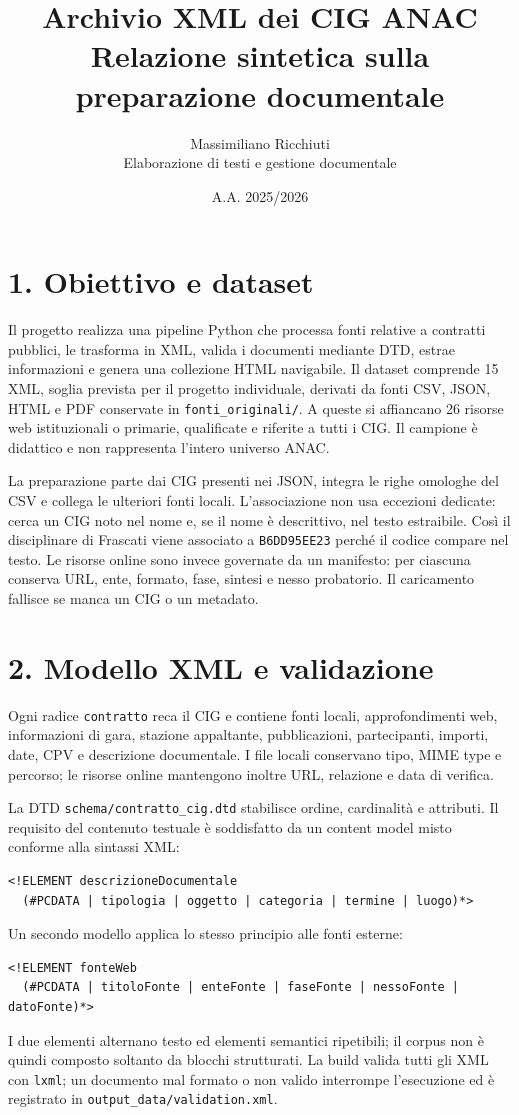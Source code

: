 \documentclass[10pt,a4paper]{article}
\title{\vspace{-1.2cm}\textbf{Archivio XML dei CIG ANAC}\\[2pt]\large Relazione sintetica sulla preparazione documentale}
\author{Massimiliano Ricchiuti\\Elaborazione di testi e gestione documentale}
\date{A.A. 2025/2026}
\newcommand{\code}[1]{\texttt{#1}}
\begin{document}
\maketitle
\vspace{-1.1cm}

\section*{1. Obiettivo e dataset}
Il progetto realizza una pipeline Python che processa fonti relative a contratti pubblici, le trasforma in XML, valida i documenti mediante DTD, estrae informazioni e genera una collezione HTML navigabile. Il dataset comprende 15 XML, soglia prevista per il progetto individuale, derivati da fonti CSV, JSON, HTML e PDF conservate in \code{fonti\_originali/}. A queste si affiancano 26 risorse web istituzionali o primarie, qualificate e riferite a tutti i CIG. Il campione è didattico e non rappresenta l'intero universo ANAC.

La preparazione parte dai CIG presenti nei JSON, integra le righe omologhe del CSV e collega le ulteriori fonti locali. L'associazione non usa eccezioni dedicate: cerca un CIG noto nel nome e, se il nome è descrittivo, nel testo estraibile. Così il disciplinare di Frascati viene associato a \code{B6DD95EE23} perché il codice compare nel testo. Le risorse online sono invece governate da un manifesto: per ciascuna conserva URL, ente, formato, fase, sintesi e nesso probatorio. Il caricamento fallisce se manca un CIG o un metadato.

\section*{2. Modello XML e validazione}
Ogni radice \code{contratto} reca il CIG e contiene fonti locali, approfondimenti web, informazioni di gara, stazione appaltante, pubblicazioni, partecipanti, importi, date, CPV e descrizione documentale. I file locali conservano tipo, MIME type e percorso; le risorse online mantengono inoltre URL, relazione e data di verifica.

La DTD \code{schema/contratto\_cig.dtd} stabilisce ordine, cardinalità e attributi. Il requisito del contenuto testuale è soddisfatto da un content model misto conforme alla sintassi XML:
\begin{verbatim}
<!ELEMENT descrizioneDocumentale
  (#PCDATA | tipologia | oggetto | categoria | termine | luogo)*>
\end{verbatim}
Un secondo modello applica lo stesso principio alle fonti esterne:
\begin{verbatim}
<!ELEMENT fonteWeb
  (#PCDATA | titoloFonte | enteFonte | faseFonte | nessoFonte | datoFonte)*>
\end{verbatim}
I due elementi alternano testo ed elementi semantici ripetibili; il corpus non è quindi composto soltanto da blocchi strutturati. La build valida tutti gli XML con \code{lxml}; un documento mal formato o non valido interrompe l'esecuzione ed è registrato in \code{output\_data/validation.xml}.
\end{document}

